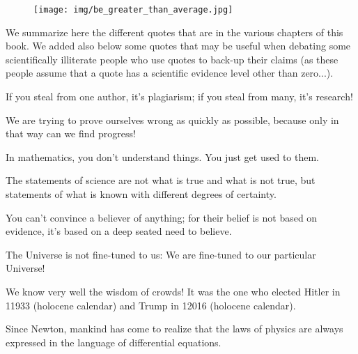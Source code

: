 	\begin{figure}[H]
		\centering
		\texttt{[image: img/be\_greater\_than\_average.jpg]}	
	\end{figure} 	
	We summarize here the different quotes that are in the various chapters of this book. We added also below some quotes that may be useful when debating some scientifically illiterate people who use quotes to back-up their claims (as these people assume that a quote has a scientific evidence level other than zero...).
	
	\begin{fuquote}If you steal from one author, it's plagiarism; if you steal from many, it's research!
 	\end{fuquote}
	
	\begin{fuquote}We are trying to prove ourselves wrong as quickly as possible, because only in that way can we find progress!
 	\end{fuquote}
 	
 	\begin{fuquote}In mathematics, you don't understand things. You just get used to them.
 	\end{fuquote}
 	
 	\begin{fuquote}The statements of science are not what is true and what is not true, but statements of what is known with different degrees of certainty.
 	\end{fuquote}
 	
 	\begin{fuquote}You can't convince a believer of anything; for their belief is not based on evidence, it's based on a deep seated need to believe.
 	\end{fuquote}
 	
 	\begin{fuquote}The Universe is not fine-tuned to us: We are fine-tuned to our particular Universe!
 	\end{fuquote}
 	
 	\begin{fuquote}[?]We know very well the wisdom of crowds! It was the one who elected Hitler in 11933 (holocene calendar) and Trump in 12016 (holocene calendar).
 	\end{fuquote}
 	
 	\begin{fuquote}Since Newton, mankind has come to realize that the laws of physics are always expressed in the language of differential equations.
 	\end{fuquote}
 	
